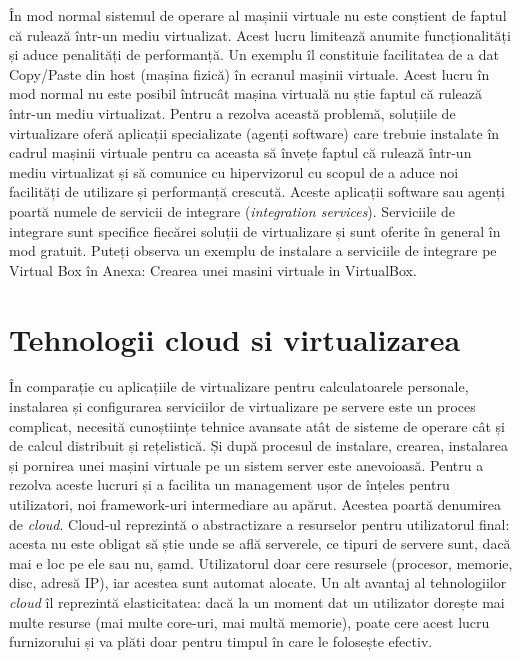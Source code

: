 În mod normal sistemul de operare al mașinii virtuale nu este conștient de
faptul că rulează într-un mediu virtualizat. Acest lucru limitează anumite
funcționalități și aduce penalități de performanță. Un exemplu îl constituie
facilitatea de a dat Copy/Paste din host (mașina fizică) în ecranul mașinii
virtuale. Acest lucru în mod normal nu este posibil întrucât mașina virtuală nu
știe faptul că rulează într-un mediu virtualizat. Pentru a rezolva această
problemă, soluțiile de virtualizare oferă aplicații specializate (agenți
software) care trebuie instalate în cadrul mașinii virtuale pentru ca aceasta să
învețe faptul că rulează într-un mediu virtualizat și să comunice cu
hipervizorul cu scopul de a aduce noi facilități de utilizare și performanță
crescută. Aceste aplicații software sau agenți poartă numele de servicii de
integrare (\textit{integration services}). Serviciile de integrare sunt
specifice fiecărei soluții de virtualizare și sunt oferite în general în mod
gratuit. Puteți observa un exemplu de instalare a serviciile de integrare pe
Virtual Box în Anexa: Crearea unei masini virtuale in VirtualBox.

\section{Tehnologii cloud si virtualizarea}
\label{sec:vm-cloud}

În comparație cu aplicațiile de virtualizare pentru calculatoarele personale,
instalarea și configurarea serviciilor de virtualizare pe servere este un proces
complicat, necesită cunoștiințe tehnice avansate atât de sisteme de operare cât
și de calcul distribuit și rețelistică. Și după procesul de instalare, crearea,
instalarea și pornirea unei mașini virtuale pe un sistem server este anevoioasă.
Pentru a rezolva aceste lucruri și a facilita un management ușor de înțeles
pentru utilizatori, noi framework-uri intermediare au apărut. Acestea poartă
denumirea de \textit{cloud}. Cloud-ul reprezintă o abstractizare a resurselor
pentru utilizatorul final: acesta nu este obligat să știe unde se află
serverele, ce tipuri de servere sunt, dacă mai e loc pe ele sau nu, șamd.
Utilizatorul doar cere resursele (procesor, memorie, disc, adresă IP), iar
acestea sunt automat alocate. Un alt avantaj al tehnologiilor \textit{cloud} îl
reprezintă elasticitatea: dacă la un moment dat un utilizator dorește mai multe
resurse (mai multe core-uri, mai multă memorie), poate cere acest lucru
furnizorului și va plăti doar pentru timpul în care le folosește efectiv.


